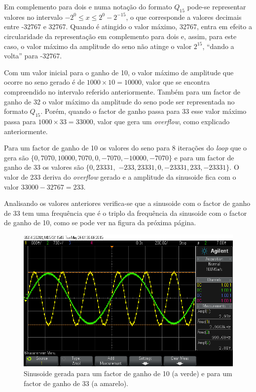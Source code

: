 \documentclass[11pt]{article}
\numberwithin{equation}{section}
\begin{document}
Em complemento para dois e numa notação do formato $Q_{15}$ pode-se representar valores no intervalo $-2^{0} \leq x \leq 2^{0} - 2^{-15}$, o que corresponde a valores decimais entre -32767 e 32767. Quando é atingido o valor máximo, 32767, entra em efeito a circularidade da representação em complemento para dois e, assim, para este caso, o valor máximo da amplitude do seno não atinge o valor $2^{15}$, ``dando a volta'' para -32767. 

Com um valor inicial para o ganho de 10, o valor máximo de amplitude que ocorre no seno gerado é de $1000 \times 10 = 10000$, valor que se encontra compreendido no intervalo referido anteriormente. Também para um factor de ganho de 32 o valor máximo da amplitude do seno pode ser representada no formato $Q_{15}$. Porém, quando o factor de ganho passa para 33 esse valor máximo passa para $1000 \times 33 = 33000$, valor que gera um \textit{overflow}, como explicado anteriormente.

Para um factor de ganho de 10 os valores do seno para 8 iterações do \textit{loop} que o gera são $\{0,7070,10000,7070,0,-7070,-10000,-7070\}$ e para um factor de ganho de 33 os valores são $\{0,23331,$ \linebreak $-233,23331,0,-23331,233,-23331\}$. O valor de 233 deriva do \textit{overflow} gerado e a amplitude da sinusoide fica com o valor $33000 - 32767 = 233$.

Analisando os valores anteriores verifica-se que a sinusoide com o factor de ganho de 33 tem uma frequência que é o triplo da frequência da sinusoide com o factor de ganho de 10, como se pode ver na figura da próxima página.

\begin{figure}[H]
	\centering
	\includegraphics[keepaspectratio=true, scale=0.37]{exps/demonstracao}
	\caption{Sinusoide gerada para um factor de ganho de 10 (a verde) e para um factor de ganho de 33 (a amarelo).}
	\vspace{-0.8em}
\end{figure}
\end{document}
